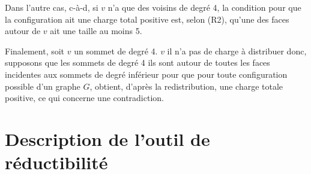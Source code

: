 \documentclass[10pt,a4paper]{article}
\begin{document}
Dans l'autre cas, c-à-d, si $v$ n'a que des voisins de degré 4, la condition pour que la configuration ait une charge total positive est, selon (R2), qu'une des faces autour de $v$ ait une taille au moins 5.

Finalement, soit $v$ un sommet de degré 4. $v$ il n'a pas de charge à distribuer donc, supposons que les sommets de degré 4 ils sont autour de toutes les faces incidentes aux sommets de degré inférieur pour que pour toute configuration possible d'un graphe $G$, obtient, d'après la redistribution, une charge totale positive, ce qui concerne une contradiction.








\section{Description de l'outil de réductibilité}
\label{chap:Des}
\end{document}
